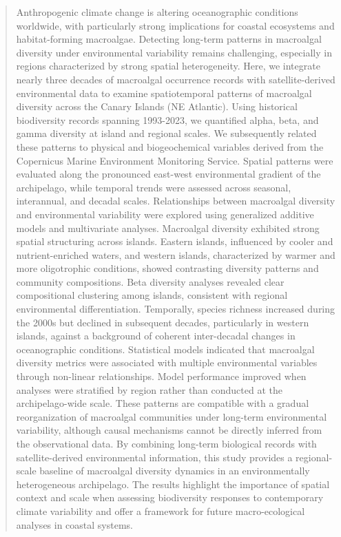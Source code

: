 \documentclass[a4paper,fleqn]{cas-sc}
\begin{document}
\begin{abstract}
Anthropogenic climate change is altering oceanographic conditions worldwide, with particularly strong implications for coastal ecosystems and habitat-forming macroalgae. Detecting long-term patterns in macroalgal diversity under environmental variability remains challenging, especially in regions characterized by strong spatial heterogeneity. Here, we integrate nearly three decades of macroalgal occurrence records with satellite-derived environmental data to examine spatiotemporal patterns of macroalgal diversity across the Canary Islands (NE Atlantic). Using historical biodiversity records spanning 1993-2023,  we quantified alpha, beta, and gamma diversity at island and regional scales. We subsequently related these patterns to physical and biogeochemical variables derived from the Copernicus Marine Environment Monitoring Service. Spatial patterns were evaluated along the pronounced east-west environmental gradient of the archipelago, while temporal trends were assessed across seasonal, interannual, and decadal scales. Relationships between macroalgal diversity and environmental variability were explored using generalized additive models and multivariate analyses. Macroalgal diversity exhibited strong spatial structuring across islands. Eastern islands, influenced by cooler and nutrient-enriched waters, and western islands, characterized by warmer and more oligotrophic conditions, showed contrasting diversity patterns and community compositions.
Beta diversity analyses revealed clear compositional clustering among islands, consistent with regional environmental differentiation. Temporally, species richness increased during the 2000s but declined in subsequent decades, particularly in western islands, against a background of coherent inter-decadal changes in oceanographic conditions. Statistical models indicated that macroalgal diversity metrics were associated with multiple environmental variables through non-linear relationships. Model performance improved when analyses were stratified by region rather than conducted at the archipelago-wide scale. These patterns are compatible with a gradual reorganization of macroalgal communities under long-term environmental variability, although causal mechanisms cannot be directly inferred from the observational data. By combining long-term biological records with satellite-derived environmental information, this study provides a regional-scale baseline of macroalgal diversity dynamics in an environmentally heterogeneous archipelago. The results highlight the importance of spatial context and scale when assessing biodiversity responses to contemporary climate variability and offer a framework for future macro-ecological analyses in coastal systems.
\end{abstract}
\end{document}
